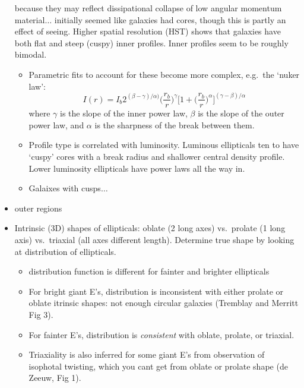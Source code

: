 \documentclass[12pt]{article}
\begin{document}
\begin{itemize}
        because they may reflect dissipational collapse of low angular
        momentum material$\ldots$ initially seemed like galaxies had cores,
        though this is partly an effect of seeing. Higher spatial
        resolution (HST) shows that galaxies have both flat and steep
        (cuspy) inner profiles. Inner profiles seem to be roughly bimodal.
        \begin{itemize}
            \item Parametric fits to account for these become more complex,
                e.g.\ the `nuker law':
                $$ I(r) = I_b2^{(\beta-\gamma)/\alpha)}
                \Big(\frac{r_b}{r}\Big)^{\gamma}
                \Big[1+\Big(\frac{r_b}{r}\Big)^{\alpha}\Big]^{(\gamma-\beta)/\alpha} $$
                where $\gamma$ is the slope of the inner power law, $\beta$ is
                the slope of the outer power law, and $\alpha$ is the sharpness
                of the break between them.
            \item Profile type is correlated with luminosity. Luminous
                ellipticals ten to have `cuspy' cores with a break radius and
                shallower central density profile. Lower luminosity ellipticals
                have power laws all the way in.
            \item Galaixes with cusps$\ldots$
        \end{itemize}
    \item outer regions
    \item Intrinsic (3D) shapes of ellipticals: oblate (2 long axes) vs.\
      prolate (1 long axis) vs.\ triaxial (all axes different length).
      Determine true shape by looking at distribution of ellipticals.
      \begin{itemize}
          \item distribution function is different for fainter and
              brighter ellipticals
          \item For bright giant E's, distribution is inconsistent with
              either prolate or oblate itrinsic shapes: not enough circular
              galaxies (Tremblay and Merritt Fig 3).
          \item For fainter E's, distribution is \textit{consistent} with
              oblate, prolate, or triaxial.
          \item Triaxiality is also inferred for some giant E's from
              observation of isophotal twisting, which you cant get from
              oblate or prolate shape (de Zeeuw, Fig 1).
      \end{itemize}

\end{itemize}
\end{document}
